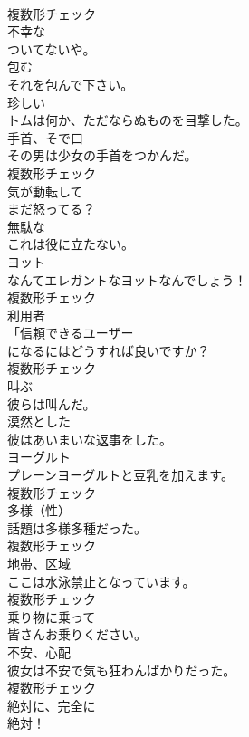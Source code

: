 \documentclass[8pt]{extreport}
\begin{document}
\begin{CJK}{UTF8}{min}
\\	複数形チェック
\\	[形容詞]	不幸な	
\\	ついてないや。	
\\	[動詞]	包む	
\\	それを包んで下さい。	
\\	[形容詞]	珍しい	
\\	トムは何か、ただならぬものを目撃した。	
\\	[名詞]	手首、そで口	
\\	その男は少女の手首をつかんだ。	
\\	複数形チェック
\\	[形容詞]	気が動転して	
\\	まだ怒ってる？	
\\	[形容詞]	無駄な	
\\	これは役に立たない。	
\\	[名詞]	ヨット	
\\	なんてエレガントなヨットなんでしょう！	
\\	複数形チェック
\\	[名詞]	利用者	
\\	「信頼できるユーザー
\\	になるにはどうすれば良いですか？	
\\	複数形チェック
\\	[動詞]	叫ぶ	
\\	彼らは叫んだ。	
\\	[形容詞]	漠然とした	
\\	彼はあいまいな返事をした。	
\\	[名詞]	ヨーグルト	
\\	プレーンヨーグルトと豆乳を加えます。	
\\	複数形チェック
\\	[名詞]	多様（性）	
\\	話題は多様多種だった。	
\\	複数形チェック
\\	[名詞]	地帯、区域	
\\	ここは水泳禁止となっています。	
\\	複数形チェック
\\	[副詞]	乗り物に乗って	
\\	皆さんお乗りください。	
\\	[名詞]	不安、心配	
\\	彼女は不安で気も狂わんばかりだった。	
\\	複数形チェック
\\	[副詞]	絶対に、完全に	
\\	絶対！	

\end{CJK}
\end{document}
